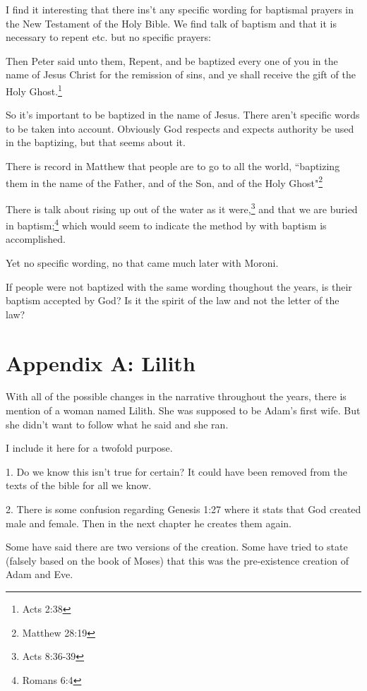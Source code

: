 \documentclass{article}
\begin{document}
I find it interesting that there ins't any specific wording for baptismal
prayers in the New Testament of the Holy Bible. We find talk of baptism and
that it is necessary to repent etc. but no specific prayers:

\begin{displayquote}
Then Peter said unto them, Repent, and be baptized every one of you in the 
name of Jesus Christ for the remission of sins, and ye shall 
receive the gift of the Holy Ghost.\footnote{Acts 2:38}
\end{displayquote}

So it's important to be baptized in the name of Jesus. There aren't specific
words to be taken into account. Obviously God respects and expects authority
be used in the baptizing, but that seems about it.

There is record in Matthew that people are to go to all the world,
``baptizing them in
the name of the Father, 
and of the Son, and of the Holy Ghost"\footnote{Matthew 28:19}

There is talk about rising up out of the water as it 
were,\footnote{Acts 8:36-39} and that we are buried in 
baptism;\footnote{Romans 6:4} which would seem to indicate the method
by with baptism is accomplished.

Yet no specific wording, no that came much later with Moroni.

If people were not baptized with the same wording thoughout the years, is their
baptism accepted by God? Is it the spirit of the law and not the letter of the
law?

\newpage

\section{Appendix A: Lilith}

With all of the possible changes in the narrative throughout the years, there is
mention of a woman named Lilith. She was supposed to be Adam's first wife. But
she didn't want to follow what he said and she ran.

I include it here for a twofold purpose.

1. Do we know this isn't true for certain? It could have been removed from the
texts of the bible for all we know.

2. There is some confusion regarding Genesis 1:27 where it stats that God
created male and female. Then in the next chapter he creates them again.

Some have said there are two versions of the creation. Some have tried to state
(falsely based on the book of Moses) that this was the pre-existence creation of
Adam and Eve.
\end{document}
